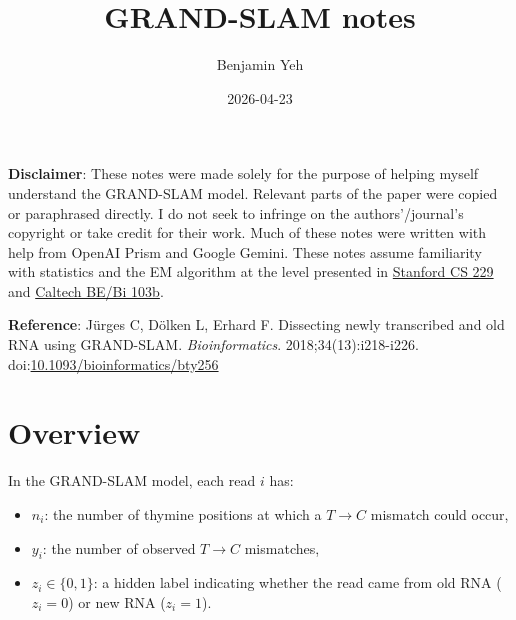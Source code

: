 \documentclass[11pt]{article}
\date{2026-04-23}
\author{Benjamin Yeh}
\title{\vspace{-2cm}GRAND-SLAM notes}
\begin{document}
\maketitle
\renewcommand{\baselinestretch}{0.5}\normalsize
\tableofcontents
\renewcommand{\baselinestretch}{1.0}\normalsize

\vfill

\textbf{Disclaimer}: These notes were made solely for the purpose of helping myself understand the GRAND-SLAM model. Relevant parts of the paper were copied or paraphrased directly. I do not seek to infringe on the authors'/journal's copyright or take credit for their work. Much of these notes were written with help from OpenAI Prism and Google Gemini. These notes assume familiarity with statistics and the EM algorithm at the level presented in \href{https://cs229.stanford.edu/main_notes.pdf}{Stanford CS 229} and \href{https://bebi103b.github.io/}{Caltech BE/Bi 103b}.

\textbf{Reference}: Jürges C, Dölken L, Erhard F. Dissecting newly transcribed and old RNA using GRAND-SLAM. \textit{Bioinformatics}. 2018;34(13):i218-i226. doi:\href{https://doi.org/10.1093/bioinformatics/bty256}{10.1093/bioinformatics/bty256}

\pagebreak

\section{Overview}

In the GRAND-SLAM model, each read $i$ has:
\begin{itemize}
    \item $n_i$: the number of thymine positions at which a $T\to C$ mismatch could occur,
    \item $y_i$: the number of observed $T\to C$ mismatches,
    \item $z_i \in \{0,1\}$: a hidden label indicating whether the read came from old RNA ($z_i=0$) or new RNA ($z_i=1$).
\end{itemize}
\end{document}
